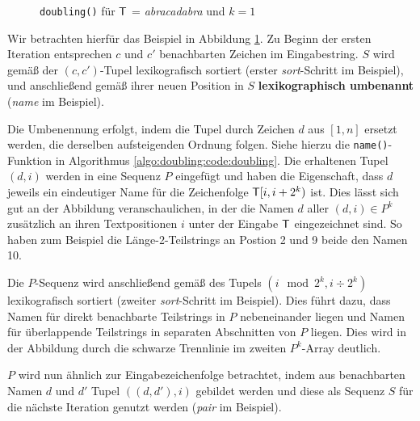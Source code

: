 \begin{figure}
\caption{\texttt{doubling()} für $\inputtext{}$ = \textit{abracadabra} und $k = 1$}
\label{algo:doubling:fig:doubling}
\end{figure}

Wir betrachten hierfür das Beispiel in Abbildung \ref{algo:doubling:fig:doubling}. Zu Beginn der ersten Iteration entsprechen $c$ und $c'$ benachbarten Zeichen im Eingabestring. $S$ wird gemäß der $(c, c')$-Tupel lexikografisch sortiert (erster \textit{sort}-Schritt im Beispiel), und anschließend gemäß ihrer neuen Position in $S$ \textbf{lexikographisch umbenannt} (\textit{name} im Beispiel).

Die Umbenennung erfolgt, indem die Tupel durch Zeichen $d$ aus $[1, n]$ ersetzt werden, die derselben aufsteigenden Ordnung folgen. Siehe hierzu die \texttt{name()}-Funktion in Algorithmus \ref{algo:doubling:code:doubling}. Die erhaltenen Tupel $(d, i)$ werden in eine Sequenz $P$ eingefügt und haben die Eigenschaft, dass $d$ jeweils ein eindeutiger Name für die Zeichenfolge $\inputtext{}[i, i + 2^k)$ ist. Dies lässt sich gut an der Abbildung veranschaulichen, in der die Namen $d$ aller $(d, i) \in P^k$ zusätzlich an ihren Textpositionen $i$ unter der Eingabe $\inputtext{}$ eingezeichnet sind. So haben zum Beispiel die Länge-2-Teilstrings an Postion 2 und 9 beide den Namen 10.

Die $P$-Sequenz wird anschließend gemäß des Tupels $(i \mod 2^k, i \div 2^k)$ lexikografisch sortiert (zweiter \textit{sort}-Schritt im Beispiel). Dies führt dazu, dass Namen für direkt benachbarte Teilstrings in $P$ nebeneinander liegen und Namen für überlappende Teilstrings in separaten Abschnitten von $P$ liegen. Dies wird in der Abbildung durch die schwarze Trennlinie im zweiten $P^k$-Array deutlich.

$P$ wird nun ähnlich zur Eingabezeichenfolge betrachtet, indem aus benachbarten Namen $d$ und $d'$ Tupel $((d, d'), i)$ gebildet werden und diese als Sequenz $S$ für die nächste Iteration genutzt werden (\textit{pair} im Beispiel).


